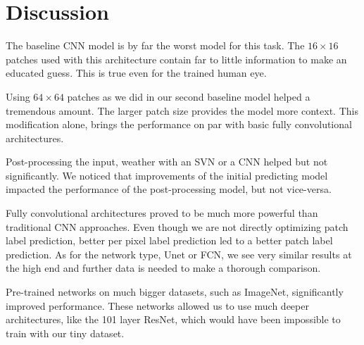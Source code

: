 \section{Discussion}
The baseline CNN model is by far the worst model for this task. The $16 \times 16$ patches used with this architecture contain far to little information to make an educated guess. This is true even for the trained human eye.

Using $64 \times 64$ patches as we did in our second baseline model helped a tremendous amount. The larger patch size provides the model more context. This modification alone, brings the performance on par with basic fully convolutional architectures.

Post-processing the input, weather with an SVN or a CNN helped but not significantly. We noticed that improvements of the initial predicting model impacted the performance of the post-processing model, but not vice-versa.

Fully convolutional architectures proved to be much more powerful than traditional CNN approaches. Even though we are not directly optimizing patch label prediction, better per pixel label prediction led to a better patch label prediction. As for the network type, Unet or FCN, we see very similar results at the high end and further data is needed to make a thorough comparison.

Pre-trained networks on much bigger datasets, such as ImageNet, significantly improved performance. These networks allowed us to use much deeper architectures, like the 101 layer ResNet, which would have been impossible to train with our tiny dataset.
